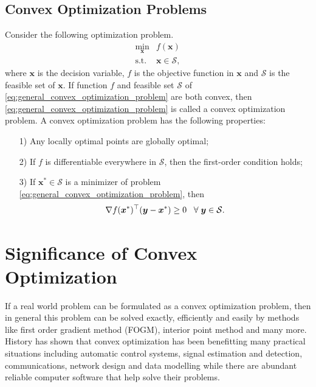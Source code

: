 \subsection{Convex Optimization Problems}
Consider the following optimization problem.
\begin{equation}
    \begin{array}{cl}
        \underset{\bm x}{\min} & f(\bm x) \\
        \text{s.t.}            & \bm x \in \mathcal S,
    \end{array}
    \label{eq:general_convex_optimization_problem}
\end{equation}
where $\bm x$ is the decision variable, $f$ is the objective function in
$\bm x$ and $\mathcal S$ is the feasible set of $\bm x$.
If function $f$ and feasible set $\mathcal S$ of
\eqref{eq:general_convex_optimization_problem} are both convex, then
\eqref{eq:general_convex_optimization_problem} is called a convex optimization
problem.
A convex optimization problem has the following properties:
\begin{itemize}
    \item [1)] Any locally optimal points are globally optimal;
    \item [2)] If $f$ is differentiable everywhere in $\mathcal S$, then the
               first-order condition holds;
    \item [3)] If $\bm x^* \in \mathcal S$ is a minimizer of problem
               \eqref{eq:general_convex_optimization_problem}, then
               \begin{equation}
                   \nabla f(\bm x^*)^\top (\bm y - \bm x^*) \geq 0
                   \;\;\; \forall \; \bm y \in \mathcal S.
               \end{equation}
\end{itemize}

\section{Significance of Convex Optimization}
If a real world problem can be formulated as a convex optimization problem,
then in general this problem can be solved exactly, efficiently and easily by
methods like first order gradient method (FOGM), interior point method and
many more.
History has shown that convex optimization has been benefitting many practical
situations including automatic control
systems, signal estimation and detection, communications, network design and
data modelling while there are abundant reliable computer software that help
solve their problems.


